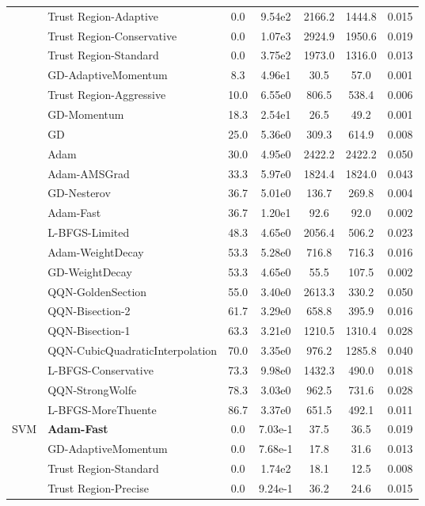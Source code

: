 \documentclass{article}
\begin{document}
\begin{table}[htbp]
{\begin{tabular}{p{2.5cm}p{2.5cm}*{5}{c}}
 & Trust Region-Adaptive & 0.0 & 9.54e2 & 2166.2 & 1444.8 & 0.015 \\
 & Trust Region-Conservative & 0.0 & 1.07e3 & 2924.9 & 1950.6 & 0.019 \\
 & Trust Region-Standard & 0.0 & 3.75e2 & 1973.0 & 1316.0 & 0.013 \\
 & GD-AdaptiveMomentum & 8.3 & 4.96e1 & 30.5 & 57.0 & 0.001 \\
 & Trust Region-Aggressive & 10.0 & 6.55e0 & 806.5 & 538.4 & 0.006 \\
 & GD-Momentum & 18.3 & 2.54e1 & 26.5 & 49.2 & 0.001 \\
 & GD & 25.0 & 5.36e0 & 309.3 & 614.9 & 0.008 \\
 & Adam & 30.0 & 4.95e0 & 2422.2 & 2422.2 & 0.050 \\
 & Adam-AMSGrad & 33.3 & 5.97e0 & 1824.4 & 1824.0 & 0.043 \\
 & GD-Nesterov & 36.7 & 5.01e0 & 136.7 & 269.8 & 0.004 \\
 & Adam-Fast & 36.7 & 1.20e1 & 92.6 & 92.0 & 0.002 \\
 & L-BFGS-Limited & 48.3 & 4.65e0 & 2056.4 & 506.2 & 0.023 \\
 & Adam-WeightDecay & 53.3 & 5.28e0 & 716.8 & 716.3 & 0.016 \\
 & GD-WeightDecay & 53.3 & 4.65e0 & 55.5 & 107.5 & 0.002 \\
 & QQN-GoldenSection & 55.0 & 3.40e0 & 2613.3 & 330.2 & 0.050 \\
 & QQN-Bisection-2 & 61.7 & 3.29e0 & 658.8 & 395.9 & 0.016 \\
 & QQN-Bisection-1 & 63.3 & 3.21e0 & 1210.5 & 1310.4 & 0.028 \\
 & QQN-CubicQuadraticInterpolation & 70.0 & 3.35e0 & 976.2 & 1285.8 & 0.040 \\
 & L-BFGS-Conservative & 73.3 & 9.98e0 & 1432.3 & 490.0 & 0.018 \\
 & QQN-StrongWolfe & 78.3 & 3.03e0 & 962.5 & 731.6 & 0.028 \\
 & L-BFGS-MoreThuente & 86.7 & 3.37e0 & 651.5 & 492.1 & 0.011 \\
\midrule
\multirow{25}{*}{SVM} & \textbf{Adam-Fast} & 0.0 & 7.03e-1 & 37.5 & 36.5 & 0.019 \\
 & GD-AdaptiveMomentum & 0.0 & 7.68e-1 & 17.8 & 31.6 & 0.013 \\
 & Trust Region-Standard & 0.0 & 1.74e2 & 18.1 & 12.5 & 0.008 \\
 & Trust Region-Precise & 0.0 & 9.24e-1 & 36.2 & 24.6 & 0.015 \\

\end{tabular}}
\end{table}
\end{document}
